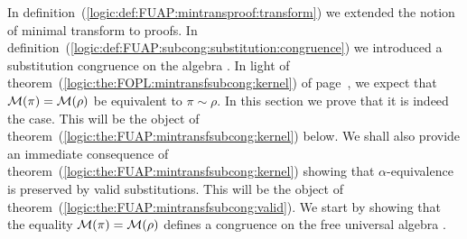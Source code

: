 In definition~(\ref{logic:def:FUAP:mintransproof:transform}) we
extended the notion of minimal transform to proofs. In
definition~(\ref{logic:def:FUAP:subcong:substitution:congruence}) we
introduced a substitution congruence on the algebra \pvs. In light
of theorem~(\ref{logic:the:FOPL:mintransfsubcong:kernel}) of
page~\pageref{logic:the:FOPL:mintransfsubcong:kernel}, we expect
that ${\cal M}(\pi)={\cal M}(\rho)$ be equivalent to $\pi\sim\rho$.
In this section we prove that it is indeed the case. This will be
the object of theorem~(\ref{logic:the:FUAP:mintransfsubcong:kernel})
below. We shall also provide an immediate consequence of
theorem~(\ref{logic:the:FUAP:mintransfsubcong:kernel}) showing that
$\alpha$-equivalence is preserved by valid substitutions. This will
be the object of
theorem~(\ref{logic:the:FUAP:mintransfsubcong:valid}). We start by
showing that the equality  ${\cal M}(\pi)={\cal M}(\rho)$ defines a
congruence on the free universal algebra \pvs.

